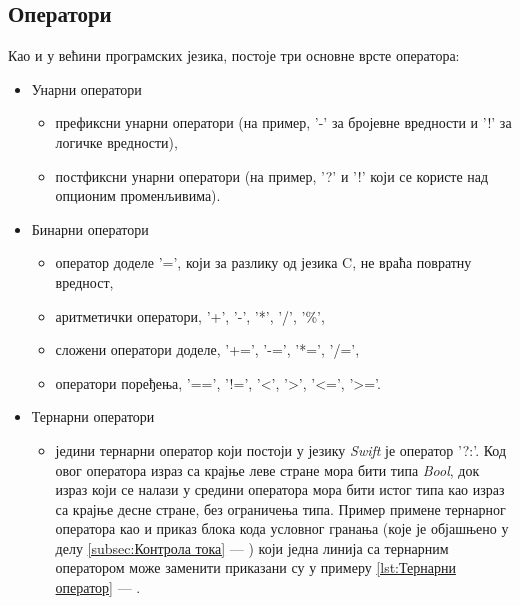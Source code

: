 \documentclass[12pt,oneside]{memoir}
\begin{document}
\subsection{Оператори}

\indent Као и у већини програмских језика, постоје три основне врсте оператора: 

\begin{itemize}
  \item Унарни оператори
  
\begin{itemize}
    \item префиксни унарни оператори (на пример, '-' за бројевне вредности и '!' за логичке вредности),  
    \item постфиксни унарни оператори (на пример, '?' и '!' који се користе над опционим променљивима).
\end{itemize}
  
  \item Бинарни оператори
  
\begin{itemize}
    \item оператор доделе '=', који за разлику од језика C, не враћа повратну вредност,
    \item аритметички оператори, '+', '-', '*', '/', '\%',
    \item сложени оператори доделе, '+=', '-=', '*=', '/=',
    \item оператори поређења, '==', '!=', '<', '>', '<=', '>='.
\end{itemize}
 
  \item Тернарни оператори

\begin{itemize}
    \item једини тернарни оператор који постоји у језику \textit{Swift} је оператор '?:'. Код овог оператора израз са крајње леве стране мора бити типа \textit{Bool}, док израз
    који се налази у средини оператора мора бити истог типа као израз са крајње
    десне стране, без ограничења типа. Пример примене тернарног оператора
    као и приказ блока кода условног гранања (које је објашњено у делу \ref{subsec:Контрола тока} --- ) који једна линија са тернарним оператором може заменити приказани су у примеру \ref{lst:Тернарни оператор} --- .
  
\end{itemize}

\end{itemize}
\end{document}
